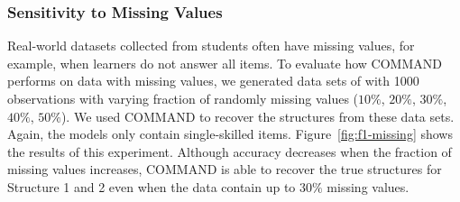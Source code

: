 \documentclass{edm_template}
\begin{document}
	\subsubsection{Sensitivity to Missing Values}
	Real-world datasets collected from students often have missing values, for example, when  learners  do not answer  all items. %
	To evaluate how COMMAND performs on data with missing values, we generated data sets of with 1000 observations with varying fraction of randomly missing values ($10\%$, $20\%$, $30\%$, $40\%$, $50\%$).
	We used COMMAND to recover the structures from these data sets.
	 Again, the models only contain single-skilled items.  
	Figure~\ref{fig:f1-missing} shows the results of this experiment.
	Although  accuracy decreases when the fraction of missing values increases,
	COMMAND is  able to recover the true structures for Structure 1 and 2 even when the data contain up to $30\%$ missing values. 
\end{document}
